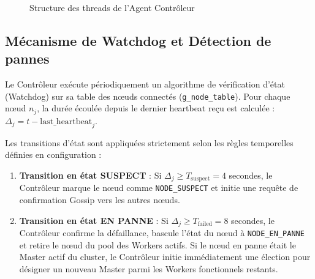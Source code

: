\documentclass[12pt,a4paper]{report}
\begin{document}
\begin{figure}[H]
\centering
{}
\caption{Structure des threads de l'Agent Contrôleur}
\label{fig:threads_controller}
\end{figure}

\subsection{Mécanisme de Watchdog et Détection de pannes}

Le Contrôleur exécute périodiquement un algorithme de vérification d'état (Watchdog) sur sa table des nœuds connectés (\texttt{g\_node\_table}). Pour chaque nœud $n_j$, la durée écoulée depuis le dernier heartbeat reçu est calculée : $\Delta_j = t - \text{last\_heartbeat}_j$. 

Les transitions d'état sont appliquées strictement selon les règles temporelles définies en configuration :
\begin{enumerate}
    \item \textbf{Transition en état SUSPECT} : Si $\Delta_j \geq T_{\text{suspect}} = 4$ secondes, le Contrôleur marque le nœud comme \texttt{NODE\_SUSPECT} et initie une requête de confirmation Gossip vers les autres nœuds.
    \item \textbf{Transition en état EN PANNE} : Si $\Delta_j \geq T_{\text{failed}} = 8$ secondes, le Contrôleur confirme la défaillance, bascule l'état du nœud à \texttt{NODE\_EN\_PANNE} et retire le nœud du pool des Workers actifs. Si le nœud en panne était le Master actif du cluster, le Contrôleur initie immédiatement une élection pour désigner un nouveau Master parmi les Workers fonctionnels restants.
\end{enumerate}
\end{document}
